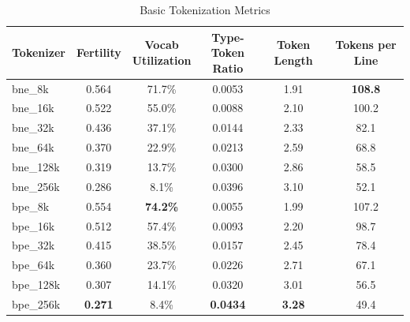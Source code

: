 \begin{table}[htbp]
\centering
\caption{Basic Tokenization Metrics}
\label{tab:basic_metrics}
\begin{tabular}{lccccc}
\toprule
Tokenizer & Fertility & \makecell{Vocab \\ Utilization} & \makecell{Type-Token \\ Ratio} & Token Length & Tokens per Line \\
\midrule
bne\_8k & 0.564 & 71.7\% & 0.0053 & 1.91 & \textbf{108.8} \\
bne\_16k & 0.522 & 55.0\% & 0.0088 & 2.10 & 100.2 \\
bne\_32k & 0.436 & 37.1\% & 0.0144 & 2.33 & 82.1 \\
bne\_64k & 0.370 & 22.9\% & 0.0213 & 2.59 & 68.8 \\
bne\_128k & 0.319 & 13.7\% & 0.0300 & 2.86 & 58.5 \\
bne\_256k & 0.286 & 8.1\% & 0.0396 & 3.10 & 52.1 \\
bpe\_8k & 0.554 & \textbf{74.2\%} & 0.0055 & 1.99 & 107.2 \\
bpe\_16k & 0.512 & 57.4\% & 0.0093 & 2.20 & 98.7 \\
bpe\_32k & 0.415 & 38.5\% & 0.0157 & 2.45 & 78.4 \\
bpe\_64k & 0.360 & 23.7\% & 0.0226 & 2.71 & 67.1 \\
bpe\_128k & 0.307 & 14.1\% & 0.0320 & 3.01 & 56.5 \\
bpe\_256k & \textbf{0.271} & 8.4\% & \textbf{0.0434} & \textbf{3.28} & 49.4 \\
\bottomrule
\end{tabular}
\end{table}